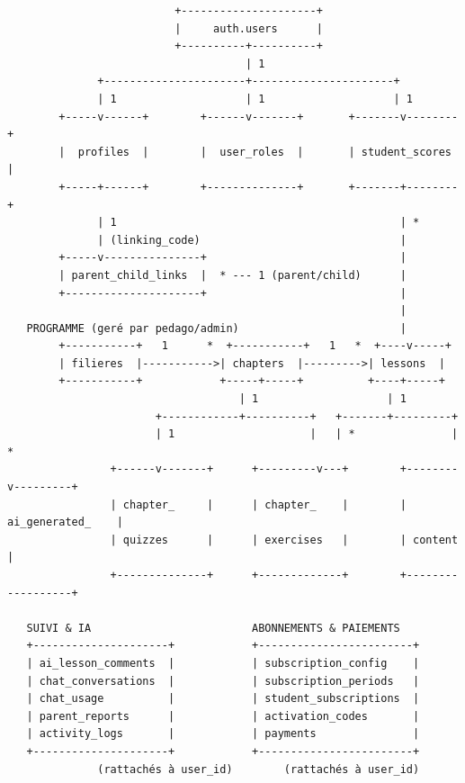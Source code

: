 \begin{center}
\footnotesize
\begin{verbatim}
                          +---------------------+
                          |     auth.users      |
                          +----------+----------+
                                     | 1
              +----------------------+----------------------+
              | 1                    | 1                    | 1
        +-----v------+        +------v-------+       +-------v--------+
        |  profiles  |        |  user_roles  |       | student_scores |
        +-----+------+        +--------------+       +-------+--------+
              | 1                                            | *
              | (linking_code)                               |
        +-----v---------------+                              |
        | parent_child_links  |  * --- 1 (parent/child)      |
        +---------------------+                              |
                                                             |
   PROGRAMME (geré par pedago/admin)                         |
        +-----------+   1      *  +-----------+   1   *  +----v-----+
        | filieres  |----------->| chapters  |--------->| lessons  |
        +-----------+            +-----+-----+          +----+-----+
                                    | 1                    | 1
                       +------------+----------+   +-------+---------+
                       | 1                     |   | *               | *
                +------v-------+      +---------v---+        +--------v---------+
                | chapter_     |      | chapter_    |        | ai_generated_    |
                | quizzes      |      | exercises   |        | content          |
                +--------------+      +-------------+        +------------------+

   SUIVI & IA                         ABONNEMENTS & PAIEMENTS
   +---------------------+            +------------------------+
   | ai_lesson_comments  |            | subscription_config    |
   | chat_conversations  |            | subscription_periods   |
   | chat_usage          |            | student_subscriptions  |
   | parent_reports      |            | activation_codes       |
   | activity_logs       |            | payments               |
   +---------------------+            +------------------------+
              (rattachés à user_id)        (rattachés à user_id)
\end{verbatim}
\end{center}

